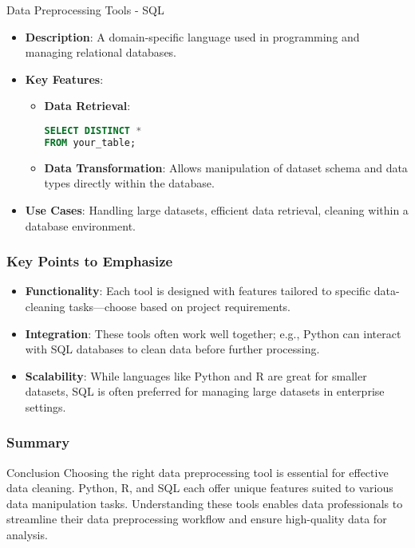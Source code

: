 \documentclass[aspectratio=169]{beamer}
\begin{document}
\begin{frame}{Data Preprocessing Tools - SQL}
    \begin{itemize}
        \item \textbf{Description}: A domain-specific language used in programming and managing relational databases.
        \item \textbf{Key Features}:
            \begin{itemize}
                \item \textbf{Data Retrieval}:
                \begin{lstlisting}[language=SQL]
SELECT DISTINCT *
FROM your_table;
                \end{lstlisting}
                \item \textbf{Data Transformation}: Allows manipulation of dataset schema and data types directly within the database.
            \end{itemize}
        \item \textbf{Use Cases}: Handling large datasets, efficient data retrieval, cleaning within a database environment.
    \end{itemize}
\end{frame}

\begin{frame}
    \frametitle{Key Points to Emphasize}
    \begin{itemize}
        \item \textbf{Functionality}: Each tool is designed with features tailored to specific data-cleaning tasks—choose based on project requirements.
        \item \textbf{Integration}: These tools often work well together; e.g., Python can interact with SQL databases to clean data before further processing.
        \item \textbf{Scalability}: While languages like Python and R are great for smaller datasets, SQL is often preferred for managing large datasets in enterprise settings.
    \end{itemize}
\end{frame}

\begin{frame}
    \frametitle{Summary}
    \begin{block}{Conclusion}
        Choosing the right data preprocessing tool is essential for effective data cleaning. Python, R, and SQL each offer unique features suited to various data manipulation tasks. 
        Understanding these tools enables data professionals to streamline their data preprocessing workflow and ensure high-quality data for analysis.
    \end{block}
\end{frame}
\end{document}
